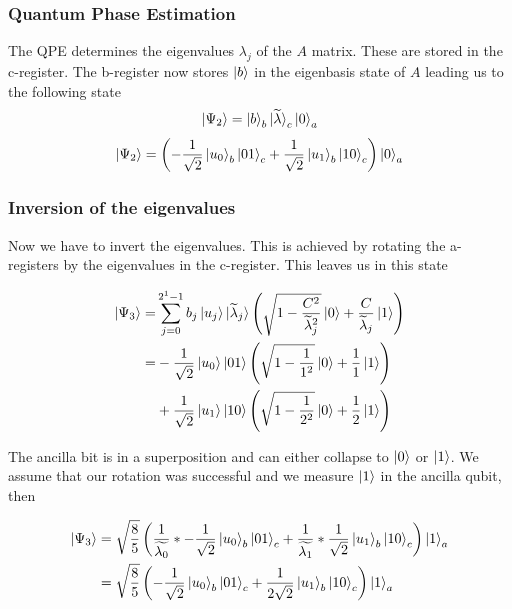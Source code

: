 \subsubsection{Quantum Phase Estimation}
    The QPE determines the eigenvalues $\lambda_j$ of the $A$ matrix. 
    These are stored in the c-register. 
    The b-register now stores $\ket b$ in the eigenbasis state of $A$ leading us to the following state
    \begin{equation}
    \ket{\Psi_2} = \ket{b}_b \ket{\widetilde{\lambda}}_c\ket{0}_a
    \end{equation}
    \begin{equation}
    \ket{\Psi_2} =\left(-\frac{1}{\sqrt{2}} \ket{u_0}_b \ket{01}_c +\frac{1}{\sqrt{2}} \ket{u_1}_b \ket{10}_c \right)  \ket{0}_a
    \end{equation}


\subsubsection{Inversion of the eigenvalues}
    Now we have to invert the eigenvalues. 
    This is achieved by rotating the a-registers by the eigenvalues in the c-register.
    This leaves us in this state

    \begin{equation}
     \begin{split}
    \ket{\Psi_3} =& \sum_{j=0}^{2^{1}-1} b_j \ket{u_j} \ket{\widetilde{\lambda}_j} \left(\sqrt{1-\frac{C^2}{\widetilde{\lambda}_j^2}}\ket{0} + \frac{C}{\widetilde{\lambda}_j} \ket{1}\right) \\
    =&-\frac{1}{\sqrt{2}} \ket{u_0} \ket{01}\left(\sqrt{1-\frac{1}{1^2}}\ket{0} + \frac{1}{1} \ket{1}\right) \\
    &+\frac{1}{\sqrt{2}}  \ket{u_1} \ket{10} \left(\sqrt{1-\frac{1}{2^2}}\ket{0} + \frac{1}{2} \ket{1}\right)
     \end{split}
    \end{equation}

    The ancilla bit is in a superposition and can either collapse to $\ket 0$ or $\ket 1$.
    We assume that our rotation was successful and we measure $\ket{1}$ in the ancilla qubit, then

    \begin{equation}
    \begin{split}
    \ket{\Psi_3} &=\sqrt{\frac{8}{5}}\left(\frac {1} {\widetilde{\lambda_0}} *-\frac{1}{\sqrt{2}} \ket{u_0}_b\ket{01}_c +\frac{1}{\widetilde{\lambda_1}}*\frac{1}{\sqrt{2}} \ket{u_1}_b\ket{10}_c\right)\ket{1}_a \\
    &=\sqrt{\frac{8}{5}}\left(-\frac{1}{\sqrt{2}} \ket{u_0}_b\ket{01}_c +\frac{1}{2\sqrt{2}} \ket{u_1}_b\ket{10}_c\right)\ket{1}_a 
    \end{split}
    \end{equation}

